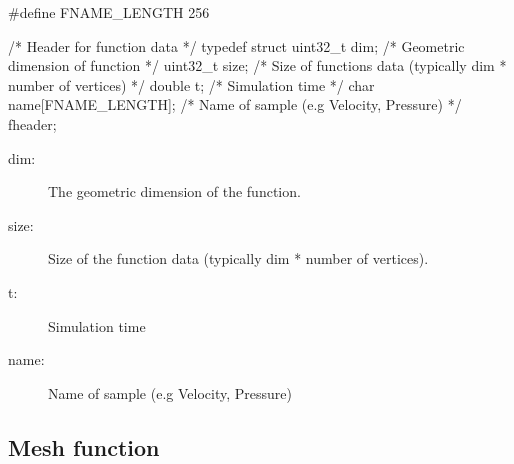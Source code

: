 \begin{code}
#define FNAME_LENGTH 256

/* Header for function data */
typedef struct {
  uint32_t dim;                 /* Geometric dimension of function */
  uint32_t size;                /* Size of functions data (typically dim * number of vertices) */
  double t;                     /* Simulation time */
  char name[FNAME_LENGTH];      /* Name of sample (e.g Velocity, Pressure) */
} fheader;
\end{code}

\begin{description}
\item[dim:] The geometric dimension of the function.
\item[size:] Size of the function data (typically dim * number of vertices).
\item[t:] Simulation time
\item[name:] Name of sample (e.g Velocity, Pressure)
\end{description}

   



\subsection{Mesh function}
